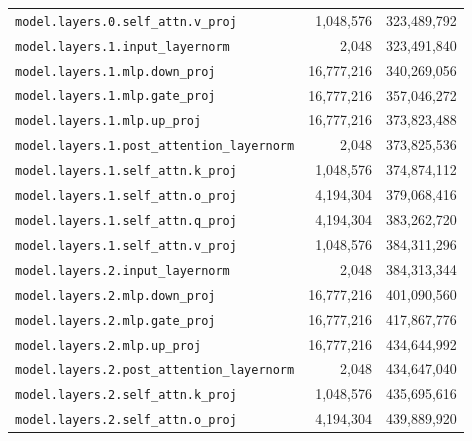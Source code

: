 \documentclass[10pt,a4paper]{article}
\begin{document}
\begin{appendices}
\begin{longtable}{p{9.5cm}rr}
\texttt{model.\allowbreak{}layers.\allowbreak{}0.\allowbreak{}self\_attn.\allowbreak{}v\_proj} & 1,048,576 & 323,489,792 \\
\texttt{model.\allowbreak{}layers.\allowbreak{}1.\allowbreak{}input\_layernorm} & 2,048 & 323,491,840 \\
\texttt{model.\allowbreak{}layers.\allowbreak{}1.\allowbreak{}mlp.\allowbreak{}down\_proj} & 16,777,216 & 340,269,056 \\
\texttt{model.\allowbreak{}layers.\allowbreak{}1.\allowbreak{}mlp.\allowbreak{}gate\_proj} & 16,777,216 & 357,046,272 \\
\texttt{model.\allowbreak{}layers.\allowbreak{}1.\allowbreak{}mlp.\allowbreak{}up\_proj} & 16,777,216 & 373,823,488 \\
\texttt{model.\allowbreak{}layers.\allowbreak{}1.\allowbreak{}post\_attention\_layernorm} & 2,048 & 373,825,536 \\
\texttt{model.\allowbreak{}layers.\allowbreak{}1.\allowbreak{}self\_attn.\allowbreak{}k\_proj} & 1,048,576 & 374,874,112 \\
\texttt{model.\allowbreak{}layers.\allowbreak{}1.\allowbreak{}self\_attn.\allowbreak{}o\_proj} & 4,194,304 & 379,068,416 \\
\texttt{model.\allowbreak{}layers.\allowbreak{}1.\allowbreak{}self\_attn.\allowbreak{}q\_proj} & 4,194,304 & 383,262,720 \\
\texttt{model.\allowbreak{}layers.\allowbreak{}1.\allowbreak{}self\_attn.\allowbreak{}v\_proj} & 1,048,576 & 384,311,296 \\
\texttt{model.\allowbreak{}layers.\allowbreak{}2.\allowbreak{}input\_layernorm} & 2,048 & 384,313,344 \\
\texttt{model.\allowbreak{}layers.\allowbreak{}2.\allowbreak{}mlp.\allowbreak{}down\_proj} & 16,777,216 & 401,090,560 \\
\texttt{model.\allowbreak{}layers.\allowbreak{}2.\allowbreak{}mlp.\allowbreak{}gate\_proj} & 16,777,216 & 417,867,776 \\
\texttt{model.\allowbreak{}layers.\allowbreak{}2.\allowbreak{}mlp.\allowbreak{}up\_proj} & 16,777,216 & 434,644,992 \\
\texttt{model.\allowbreak{}layers.\allowbreak{}2.\allowbreak{}post\_attention\_layernorm} & 2,048 & 434,647,040 \\
\texttt{model.\allowbreak{}layers.\allowbreak{}2.\allowbreak{}self\_attn.\allowbreak{}k\_proj} & 1,048,576 & 435,695,616 \\
\texttt{model.\allowbreak{}layers.\allowbreak{}2.\allowbreak{}self\_attn.\allowbreak{}o\_proj} & 4,194,304 & 439,889,920 \\

\end{longtable}
\end{appendices}
\end{document}
